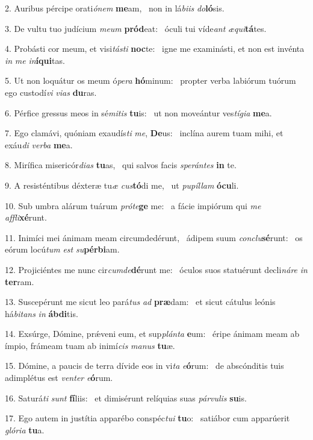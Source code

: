2. Auribus pércipe orati\textit{ó}\textit{nem} \textbf{me}am, \ast\  non in lá\textit{bi}\textit{is} \textit{do}\textbf{ló}sis.\

3. De vultu tuo judícium \textit{me}\textit{um} \textbf{pród}eat: \ast\  óculi tui víde\textit{ant} \textit{æ}\textit{qui}\textbf{tá}tes.\

4. Probásti cor meum, et visi\textit{tás}\textit{ti} \textbf{noc}te: \ast\  igne me examinásti, et non est invénta \textit{in} \textit{me} \textit{in}\textbf{í}\textbf{qui}tas.\

5. Ut non loquátur os meum ó\textit{pe}\textit{ra} \textbf{hó}minum: \ast\  propter verba labiórum tuórum ego custodí\textit{vi} \textit{vi}\textit{as} \textbf{du}ras.\

6. Pérfice gressus meos in sé\textit{mi}\textit{tis} \textbf{tu}is: \ast\  ut non moveántur ves\textit{tí}\textit{gi}\textit{a} \textbf{me}a.\

7. Ego clamávi, quóniam exaudís\textit{ti} \textit{me}, \textbf{De}us: \ast\  inclína aurem tuam mihi, et exáu\textit{di} \textit{ver}\textit{ba} \textbf{me}a.\

8. Mirífica misericór\textit{di}\textit{as} \textbf{tu}as, \ast\  qui salvos facis \textit{spe}\textit{rán}\textit{tes} \textbf{in} te.\

9. A resisténtibus déxteræ tu\textit{æ} \textit{cus}\textbf{tó}di me, \ast\  ut \textit{pu}\textit{píl}\textit{lam} \textbf{ó}\textbf{cu}li.\

10. Sub umbra alárum tuárum \textit{pró}\textit{te}\textbf{ge} me: \ast\  a fácie impiórum qui \textit{me} \textit{af}\textit{fli}\textbf{xé}runt.\

11. Inimíci mei ánimam meam circumdedérunt, \dag\  ádipem suum \textit{con}\textit{clu}\textbf{sé}runt: \ast\  os eórum locú\textit{tum} \textit{est} \textit{su}\textbf{pér}\textbf{bi}am.\

12. Projiciéntes me nunc cir\textit{cum}\textit{de}\textbf{dé}runt me: \ast\  óculos suos statuérunt decli\textit{ná}\textit{re} \textit{in} \textbf{ter}ram.\

13. Suscepérunt me sicut leo pará\textit{tus} \textit{ad} \textbf{præ}dam: \ast\  et sicut cátulus leónis há\textit{bi}\textit{tans} \textit{in} \textbf{áb}\textbf{di}tis.\

14. Exsúrge, Dómine, prǽveni eum, et sup\textit{plán}\textit{ta} \textbf{e}um: \ast\  éripe ánimam meam ab ímpio, frámeam tuam ab inimí\textit{cis} \textit{ma}\textit{nus} \textbf{tu}æ.\

15. Dómine, a paucis de terra dívide eos in vi\textit{ta} \textit{e}\textbf{ó}rum: \ast\  de abscónditis tuis adimplétus est \textit{ven}\textit{ter} \textit{e}\textbf{ó}rum.\

16. Saturá\textit{ti} \textit{sunt} \textbf{fí}liis: \ast\  et dimisérunt relíquias suas \textit{pár}\textit{vu}\textit{lis} \textbf{su}is.\

17. Ego autem in justítia apparébo conspéc\textit{tu}\textit{i} \textbf{tu}o: \ast\  satiábor cum apparúerit \textit{gló}\textit{ri}\textit{a} \textbf{tu}a.\

